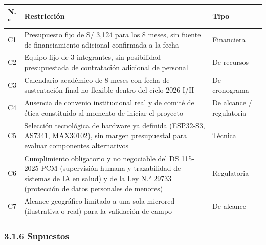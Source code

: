 \documentclass[11pt,a4paper]{article}
\begin{document}
{\small
\begin{longtable}[]{@{}
  >{\raggedright\arraybackslash}p{}
  >{\raggedright\arraybackslash}p{}
  >{\raggedright\arraybackslash}p{}@{}}
\toprule\noalign{}
\begin{minipage}[b]{\linewidth}\raggedright
N.°
\end{minipage} & \begin{minipage}[b]{\linewidth}\raggedright
Restricción
\end{minipage} & \begin{minipage}[b]{\linewidth}\raggedright
Tipo
\end{minipage} \\
\midrule\noalign{}
\endhead
\bottomrule\noalign{}
\endlastfoot
C1 & Presupuesto fijo de S/ 3,124 para los 8 meses, sin fuente de financiamiento adicional confirmada a la fecha & Financiera \\
C2 & Equipo fijo de 3 integrantes, sin posibilidad presupuestada de contratación adicional de personal & De recursos \\
C3 & Calendario académico de 8 meses con fecha de sustentación final no flexible dentro del ciclo 2026-I/II & De cronograma \\
C4 & Ausencia de convenio institucional real y de comité de ética constituido al momento de iniciar el proyecto & De alcance / regulatoria \\
C5 & Selección tecnológica de hardware ya definida (ESP32-S3, AS7341, MAX30102), sin margen presupuestal para evaluar componentes alternativos & Técnica \\
C6 & Cumplimiento obligatorio y no negociable del DS 115-2025-PCM (supervisión humana y trazabilidad de sistemas de IA en salud) y de la Ley N.° 29733 (protección de datos personales de menores) & Regulatoria \\
C7 & Alcance geográfico limitado a una sola microred (ilustrativa o real) para la validación de campo & De alcance \\
\end{longtable}
}

\subsubsection{3.1.6 Supuestos}\label{supuestos}
\end{document}
